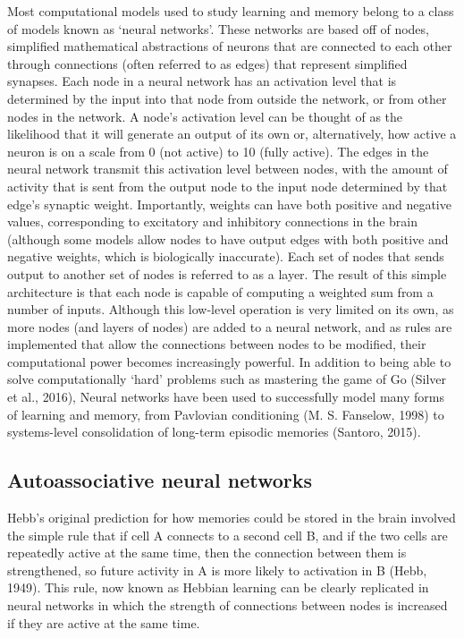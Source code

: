 \documentclass[12pt,a4paperpaper,]{report}
\begin{document}
Most computational models used to study learning and memory belong to a
class of models known as `neural networks'. These networks are based off
of nodes, simplified mathematical abstractions of neurons that are
connected to each other through connections (often referred to as edges)
that represent simplified synapses. Each node in a neural network has an
activation level that is determined by the input into that node from
outside the network, or from other nodes in the network. A node's
activation level can be thought of as the likelihood that it will
generate an output of its own or, alternatively, how active a neuron is
on a scale from 0 (not active) to 10 (fully active). The edges in the
neural network transmit this activation level between nodes, with the
amount of activity that is sent from the output node to the input node
determined by that edge's synaptic weight. Importantly, weights can have
both positive and negative values, corresponding to excitatory and
inhibitory connections in the brain (although some models allow nodes to
have output edges with both positive and negative weights, which is
biologically inaccurate). Each set of nodes that sends output to another
set of nodes is referred to as a layer. The result of this simple
architecture is that each node is capable of computing a weighted sum
from a number of inputs. Although this low-level operation is very
limited on its own, as more nodes (and layers of nodes) are added to a
neural network, and as rules are implemented that allow the connections
between nodes to be modified, their computational power becomes
increasingly powerful. In addition to being able to solve
computationally `hard' problems such as mastering the game of Go (Silver
et al., 2016), Neural networks have been used to successfully model many
forms of learning and memory, from Pavlovian conditioning (M. S.
Fanselow, 1998) to systems-level consolidation of long-term episodic
memories (Santoro, 2015).

\subsection{Autoassociative neural
networks}\label{autoassociative-neural-networks}

Hebb's original prediction for how memories could be stored in the brain
involved the simple rule that if cell A connects to a second cell B, and
if the two cells are repeatedly active at the same time, then the
connection between them is strengthened, so future activity in A is more
likely to activation in B (Hebb, 1949). This rule, now known as Hebbian
learning can be clearly replicated in neural networks in which the
strength of connections between nodes is increased if they are active at
the same time.
\end{document}
